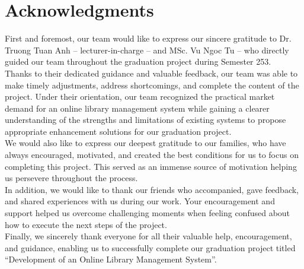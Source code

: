 \section*{Acknowledgments}
\thispagestyle{empty}

First and foremost, our team would like to express our sincere gratitude to Dr. Truong Tuan Anh – lecturer-in-charge – and MSc. Vu Ngoc Tu – who directly guided our team throughout the graduation project during Semester 253.\\
Thanks to their dedicated guidance and valuable feedback, our team was able to make timely adjustments, address shortcomings, and complete the content of the project. Under their orientation, our team recognized the practical market demand for an online library management system while gaining a clearer understanding of the strengths and limitations of existing systems to propose appropriate enhancement solutions for our graduation project.\\
We would also like to express our deepest gratitude to our families, who have always encouraged, motivated, and created the best conditions for us to focus on completing this project. This served as an immense source of motivation helping us persevere throughout the process.\\
In addition, we would like to thank our friends who accompanied, gave feedback, and shared experiences with us during our work. Your encouragement and support helped us overcome challenging moments when feeling confused about how to execute the next steps of the project.\\
Finally, we sincerely thank everyone for all their valuable help, encouragement, and guidance, enabling us to successfully complete our graduation project titled “Development of an Online Library Management System”.


\clearpage
{}
